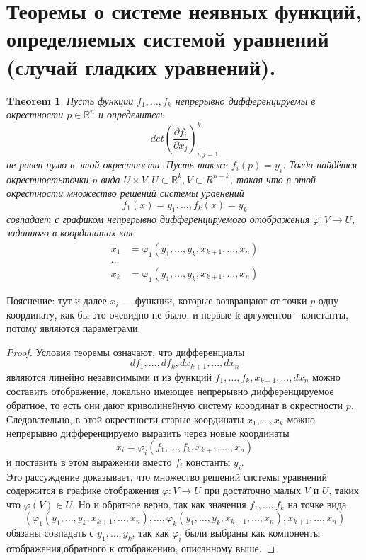 \documentclass[a4paper,12pt]{article} %
\newtheorem{theorem}{Theorem}
\theoremstyle{definition}
\begin{document}
\section{Теоремы о системе неявных функций, определяемых системой уравнений (случай гладких уравнений).}
\begin{theorem}
	Пусть функции $f_1, \dots, f_k$ непрерывно дифференцируемы в окрестности $p \in \mathbb{R}^n$ и определитель
	$$det \left( \frac{\partial f_i}{\partial x_j} \right)^k_{i, j =1}$$
	не равен нулю в этой окрестности. Пусть также $f_i(p) = y_i$. Тогда найдётся окрестностьточки $p$ вида $U \times V,U \subset \mathbb{R}^k,V \subset R^{n-k}$, такая что в этой окрестности множество решений системы уравнений
	$$f_1(x) = y_1, \dots, f_k(x) = y_k$$
	совпадает с графиком непрерывно дифференцируемого отображения $\varphi : V \rightarrow U$, заданного в координатах как
	\begin{align*}
		x_1 &= \varphi_1(y_1, \dots, y_k, x_{k+1}, \dots, x_n) \\
		\dots \\
		x_k &= \varphi_1(y_1, \dots, y_k, x_{k+1}, \dots, x_n) 
	\end{align*}
\end{theorem}
Пояснение: тут и далее $x_i$ --- функции, которые возвращают от точки $p$ одну координату, как бы это очевидно не было. и первые k аргументов - константы, потому являются параметрами.
\begin{proof}
	Условия теоремы означают, что дифференциалы $$df_1, \dots, df_k, dx_{k+1}, \dots, dx_n$$ являются линейно независимыми и из функций $f_1, \dots, f_k, x_{k+1}, \dots, dx_n$ можно составить отображение, локально имеющее непрерывно дифференцируемое обратное, то есть они дают криволинейную систему координат в окрестности $p$. Следовательно, в этой окрестности старые координаты $x_1,\dots,x_k$ можно непрерывно дифференцируемо выразить через новые координаты
	$$x_i = \varphi_i (f_1, \dots, f_k, x_{k+1}, \dots, x_n)$$
	и поставить в этом выражении вместо $f_i$ константы $y_i$.\\
	Это рассуждение доказывает, что множество решений системы уравнений содержится в графике отображения $\varphi : V \rightarrow U$ при достаточно малых $V$ и $U$, таких что $\varphi(V) \in U$. Но и обратное верно, так как значения $f_1, \dots, f_k$ на точке вида
	$$(\varphi_1(y_1,\dots,y_k,x_{k+1},\dots,x_n),\dots,\varphi_k(y_1,\dots,y_k,x_{k+1},\dots,x_n),x_{k+1},\dots,x_n)$$
	обязаны совпадать с $y_1,\dots,y_k$, так как $\varphi_i$ были выбраны как компоненты отображения,обратного к отображению, описанному выше.
\end{proof}
\end{document}
